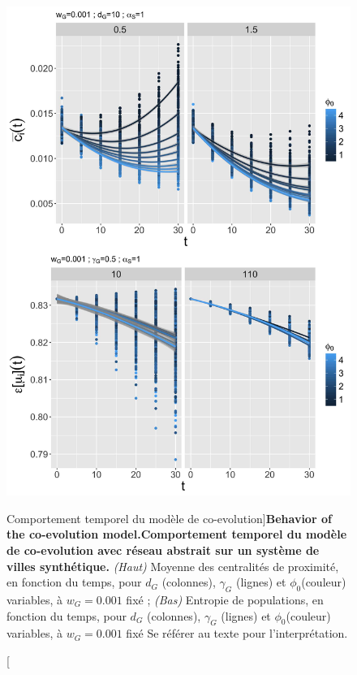 \begin{figure}
\includegraphics[width=\linewidth,height=0.9\textheight]{Figures/Final/6-2-2-fig-macrocoevol-behavior-time.jpg}
\caption[Behavior of the co-evolution model][Comportement temporel du modèle de co-evolution]{\textbf{Behavior of the co-evolution model.}\label{fig:macrocoevol:behavior-time}}{\textbf{Comportement temporel du modèle de co-evolution avec réseau abstrait sur un système de villes synthétique.} \textit{(Haut)} Moyenne des centralités de proximité, en fonction du temps, pour $d_G$ (colonnes), $\gamma_G$ (lignes) et $\phi_0$(couleur) variables, à $w_G = 0.001$ fixé ; \textit{(Bas)} Entropie de populations, en fonction du temps, pour $d_G$ (colonnes), $\gamma_G$ (lignes) et $\phi_0$(couleur) variables, à $w_G = 0.001$ fixé Se référer au texte pour l'interprétation.\label{fig:macrocoevol:behavior-time}}
\end{figure}




